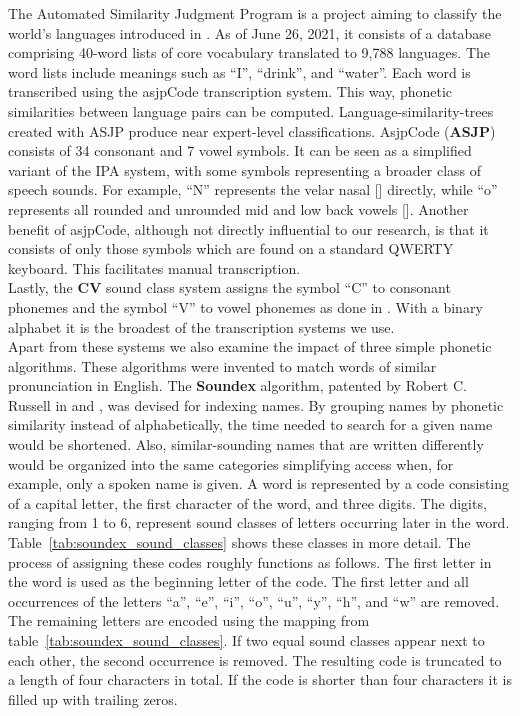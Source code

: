 The Automated Similarity Judgment Program is a project aiming to classify the world's languages introduced in \cite{brown2008asjpCode}.
As of June 26, 2021, it consists of a database comprising 40-word lists of core vocabulary translated to 9,788 languages.
The word lists include meanings such as ``I'', ``drink'', and ``water''.
Each word is transcribed using the asjpCode transcription system.
This way, phonetic similarities between language pairs can be computed.
Language-similarity-trees created with ASJP produce near expert-level classifications.
AsjpCode (\textbf{ASJP}) consists of 34 consonant and 7 vowel symbols.
It can be seen as a simplified variant of the IPA system, with some symbols representing a broader class of speech sounds.
For example, ``N'' represents the velar nasal [] directly, while ``o'' represents all rounded and unrounded mid and low back vowels [].
Another benefit of asjpCode, although not directly influential to our research, is that it consists of only those symbols which are found on a standard QWERTY keyboard.
This facilitates manual transcription.\\
Lastly, the \textbf{CV} sound class system assigns the symbol ``C'' to consonant phonemes and the symbol ``V'' to vowel phonemes as done in \cite{list2017lingpy}.
With a binary alphabet it is the broadest of the transcription systems we use.\\

Apart from these systems we also examine the impact of three simple phonetic algorithms.
These algorithms were invented to match words of similar pronunciation in English.
The \textbf{Soundex} algorithm, patented by Robert C. Russell in \cite{russel1918soundex} and \cite{russel1922soundex}, was devised for indexing names.
By grouping names by phonetic similarity instead of alphabetically, the time needed to search for a given name would be shortened.
Also, similar-sounding names that are written differently would be organized into the same categories simplifying access when, for example, only a spoken name is given.
A word is represented by a code consisting of a capital letter, the first character of the word, and three digits.
The digits, ranging from 1 to 6, represent sound classes of letters occurring later in the word.
Table~\ref{tab:soundex_sound_classes} shows these classes in more detail.
The process of assigning these codes roughly functions as follows.
The first letter in the word is used as the beginning letter of the code.
The first letter and all occurrences of the letters ``a'', ``e'', ``i'', ``o'', ``u'', ``y'', ``h'', and ``w'' are removed.
The remaining letters are encoded using the mapping from table~\ref{tab:soundex_sound_classes}.
If two equal sound classes appear next to each other, the second occurrence is removed.
The resulting code is truncated to a length of four characters in total.
If the code is shorter than four characters it is filled up with trailing zeros.\\

